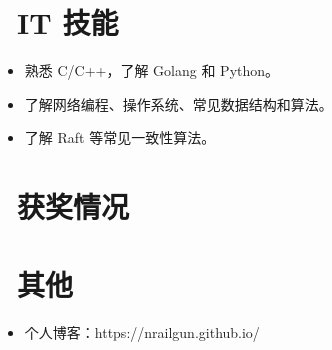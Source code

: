 \documentclass{resume}
\begin{document}

\section{\faCogs\ IT 技能}
\begin{itemize}[parsep=0.5ex]
  \item 熟悉 C/C++，了解 Golang 和 Python。
  \item 了解网络编程、操作系统、常见数据结构和算法。
  \item 了解 Raft 等常见一致性算法。
\end{itemize}

\section{\faHeartO\ 获奖情况}

\section{\faInfo\ 其他}
\begin{itemize}[parsep=0.5ex]
  \item 个人博客：https://nrailgun.github.io/
\end{itemize}

%
%
\end{document}
